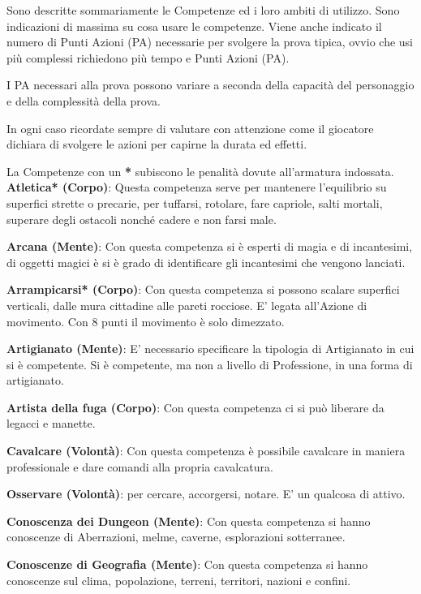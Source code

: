 \documentclass[12pt,a4paper,twoside,openany]{book}
\begin{document}
\begin{multicols}{2}
Sono descritte sommariamente le Competenze ed i loro ambiti di utilizzo. Sono indicazioni di massima su cosa usare le competenze. Viene anche indicato il numero di Punti Azioni (PA) necessarie per svolgere la prova tipica, ovvio che usi più complessi richiedono più tempo e Punti Azioni (PA).

I PA necessari alla prova possono variare a seconda della capacità del personaggio e della complessità della prova.

In ogni caso ricordate sempre di valutare con attenzione come il giocatore dichiara di svolgere le azioni per capirne la durata ed effetti. 

La Competenze con un \textbf{*} subiscono le penalità dovute all'armatura indossata.\\

\textbf{Atletica* (Corpo)}: Questa competenza serve per mantenere l'equilibrio su superfici strette o precarie, per tuffarsi, rotolare, fare capriole, salti mortali, superare degli ostacoli nonché cadere e non farsi male. 

\textbf{Arcana (Mente)}: Con questa competenza si è esperti di magia e di incantesimi, di oggetti magici è si è grado di identificare gli incantesimi che vengono lanciati. 

\textbf{Arrampicarsi* (Corpo)}: Con questa competenza si possono scalare superfici verticali, dalle mura cittadine alle pareti rocciose. E' legata all'Azione di movimento. Con 8 punti il movimento è solo dimezzato.

\textbf{Artigianato (Mente)}: E' necessario specificare la tipologia di Artigianato in cui si è competente. Si è competente, ma non a livello di Professione, in una forma di artigianato.

\textbf{Artista della fuga (Corpo)}: Con questa competenza ci si può liberare da legacci e manette.

\textbf{Cavalcare (Volontà)}: Con questa competenza è possibile cavalcare in maniera professionale e dare comandi alla propria cavalcatura. 

\textbf{Osservare (Volontà)}: per cercare, accorgersi, notare. E' un qualcosa di attivo.

\textbf{Conoscenza dei Dungeon (Mente)}: Con questa competenza si hanno conoscenze di Aberrazioni, melme, caverne, esplorazioni sotterranee.

\textbf{Conoscenze di Geografia (Mente)}: Con questa competenza si hanno conoscenze sul clima, popolazione, terreni, territori, nazioni e confini.


\end{multicols}
\end{document}
